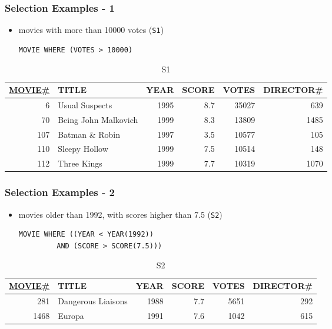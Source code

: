 \documentclass[dvipsnames]{beamer}
\theoremstyle{plain}
\begin{document}
\begin{frame}[fragile]
  \frametitle{Selection Examples - 1}

  \begin{itemize}
    \item movies with more than 10000 votes (\texttt{S1})
    \begin{lstlisting}
MOVIE WHERE (VOTES > 10000)
    \end{lstlisting}
  \end{itemize}

  \vspace{-10pt}
  \begin{tiny}
  \begin{table}
    \caption{S1}
    \begin{tabular}{|r|l|r|r|r|r|}\hline
\underline{MOVIE\#} & TITLE & YEAR & SCORE & VOTES & DIRECTOR\#\\[2pt]\hline\hline
  6 & Usual Suspects        & 1995 &   8.7 & 35027 &        639\\\hline
 70 & Being John Malkovich  & 1999 &   8.3 & 13809 &       1485\\\hline
107 & Batman \& Robin       & 1997 &   3.5 & 10577 &        105\\\hline
110 & Sleepy Hollow         & 1999 &   7.5 & 10514 &        148\\\hline
112 & Three Kings           & 1999 &   7.7 & 10319 &       1070\\\hline
    \end{tabular}
  \end{table}
  \end{tiny}
\end{frame}

\begin{frame}[fragile]
  \frametitle{Selection Examples - 2}

  \begin{itemize}
    \item movies older than 1992, with scores higher than 7.5
      (\texttt{S2})
    \begin{lstlisting}
MOVIE WHERE ((YEAR < YEAR(1992))
         AND (SCORE > SCORE(7.5)))
    \end{lstlisting}
  \end{itemize}

  \vspace{-10pt}
  \begin{tiny}
  \begin{table}
    \caption{S2}
    \begin{tabular}{|r|l|r|r|r|r|}\hline
\underline{MOVIE\#} & TITLE & YEAR & SCORE & VOTES & DIRECTOR\#\\[2pt]\hline\hline
   281 & Dangerous Liaisons & 1988 &   7.7 &  5651 &        292\\\hline
  1468 & Europa             & 1991 &   7.6 &  1042 &        615\\\hline
    \end{tabular}
  \end{table}
  \end{tiny}
\end{frame}
\end{document}
